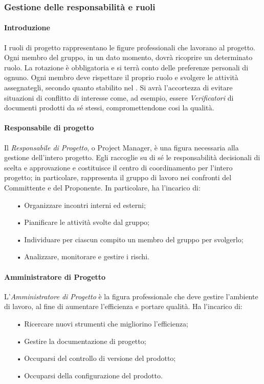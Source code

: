\subsubsection{Gestione delle responsabilità e ruoli}

\paragraph{Introduzione}
I ruoli di progetto rappresentano le figure professionali che lavorano al progetto. Ogni membro del gruppo, in un dato momento, dovrà ricoprire un determinato ruolo.  
\newline
La rotazione è obbligatoria e si terrà conto delle preferenze personali di ognuno. Ogni membro deve rispettare il proprio ruolo e svolgere le attività assegnategli, secondo quanto stabilito nel \PdP. Si avrà l'accortezza di evitare situazioni di conflitto di interesse come, ad esempio, essere \textit{Verificatori} di documenti prodotti da sé stessi, compromettendone cosi la qualità.

\paragraph{Responsabile di progetto}
Il \textit{Responsabile di Progetto}, o Project Manager, è una figura necessaria alla gestione dell’intero progetto. Egli raccoglie su di sé le responsabilità decisionali di scelta e approvazione e costituisce il centro di coordinamento per l'intero progetto; in particolare, rappresenta il gruppo di lavoro nei confronti del Committente e del Proponente. 
\newline
In particolare, ha l'incarico di:
\begin{itemize}
\item[•] Organizzare incontri interni ed esterni;
\item[•] Pianificare le attività svolte dal gruppo;
\item[•] Individuare per ciascun compito un membro del gruppo per svolgerlo;
\item[•] Analizzare, monitorare e gestire i rischi.
\end{itemize}

\paragraph{Amministratore di Progetto}
L’\textit{Amministratore di Progetto} è la figura professionale che deve gestire l’ambiente di lavoro, al fine di aumentare l’efficienza e portare qualità. 
\newline
Ha l'incarico di:
\begin{itemize}
\item[•] Ricercare nuovi strumenti che migliorino l’efficienza;
\item[•] Gestire la documentazione di progetto;
\item[•] Occuparsi del controllo di versione del prodotto;
\item[•] Occuparsi della configurazione del prodotto.
\end{itemize}

